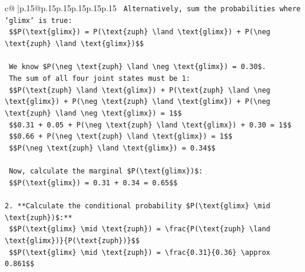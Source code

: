 \documentclass{article}
\begin{document}
{\begin{supertabular}{c@{$\;$}|p{.15\linewidth}@{}p{.15\linewidth}p{.15\linewidth}p{.15\linewidth}p{.15\linewidth}p{.15\linewidth}}
{{{\texttt{    Alternatively, sum the probabilities where `glimx` is true:} \\
\texttt{    \$\$P(\textbackslash{}text\{glimx\}) = P(\textbackslash{}text\{zuph\} \textbackslash{}land \textbackslash{}text\{glimx\}) + P(\textbackslash{}neg \textbackslash{}text\{zuph\} \textbackslash{}land \textbackslash{}text\{glimx\})\$\$} \\
\\ 
\texttt{    We know \$P(\textbackslash{}neg \textbackslash{}text\{zuph\} \textbackslash{}land \textbackslash{}neg \textbackslash{}text\{glimx\}) = 0.30\$.} \\
\texttt{    The sum of all four joint states must be 1:} \\
\texttt{    \$\$P(\textbackslash{}text\{zuph\} \textbackslash{}land \textbackslash{}text\{glimx\}) + P(\textbackslash{}text\{zuph\} \textbackslash{}land \textbackslash{}neg \textbackslash{}text\{glimx\}) + P(\textbackslash{}neg \textbackslash{}text\{zuph\} \textbackslash{}land \textbackslash{}text\{glimx\}) + P(\textbackslash{}neg \textbackslash{}text\{zuph\} \textbackslash{}land \textbackslash{}neg \textbackslash{}text\{glimx\}) = 1\$\$} \\
\texttt{    \$\$0.31 + 0.05 + P(\textbackslash{}neg \textbackslash{}text\{zuph\} \textbackslash{}land \textbackslash{}text\{glimx\}) + 0.30 = 1\$\$} \\
\texttt{    \$\$0.66 + P(\textbackslash{}neg \textbackslash{}text\{zuph\} \textbackslash{}land \textbackslash{}text\{glimx\}) = 1\$\$} \\
\texttt{    \$\$P(\textbackslash{}neg \textbackslash{}text\{zuph\} \textbackslash{}land \textbackslash{}text\{glimx\}) = 0.34\$\$} \\
\\ 
\texttt{    Now, calculate the marginal \$P(\textbackslash{}text\{glimx\})\$:} \\
\texttt{    \$\$P(\textbackslash{}text\{glimx\}) = 0.31 + 0.34 = 0.65\$\$} \\
\\ 
\texttt{2.  **Calculate the conditional probability \$P(\textbackslash{}text\{glimx\} \textbackslash{}mid \textbackslash{}text\{zuph\})\$:**} \\
\texttt{    \$\$P(\textbackslash{}text\{glimx\} \textbackslash{}mid \textbackslash{}text\{zuph\}) = \textbackslash{}frac\{P(\textbackslash{}text\{zuph\} \textbackslash{}land \textbackslash{}text\{glimx\})\}\{P(\textbackslash{}text\{zuph\})\}\$\$} \\
\texttt{    \$\$P(\textbackslash{}text\{glimx\} \textbackslash{}mid \textbackslash{}text\{zuph\}) = \textbackslash{}frac\{0.31\}\{0.36\} \textbackslash{}approx 0.861\$\$} \\
}}}
\end{supertabular}}
\end{document}
